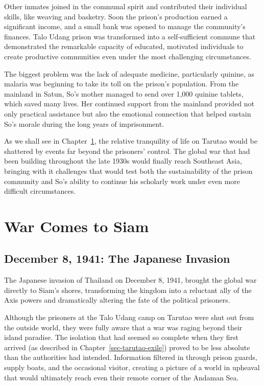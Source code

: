 \documentclass[
  Letterpaper,
]{scrbook}
\begin{document}
Other inmates joined in the communal spirit and contributed their
individual skills, like weaving and basketry. Soon the prison's
production earned a significant income, and a small bank was opened to
manage the community's finances. Talo Udang prison was transformed into
a self-sufficient commune that demonstrated the remarkable capacity of
educated, motivated individuals to create productive communities even
under the most challenging circumstances.

The biggest problem was the lack of adequate medicine, particularly
quinine, as malaria was beginning to take its toll on the prison's
population. From the mainland in Satun, So's mother managed to send over
1,000 quinine tablets, which saved many lives. Her continued support
from the mainland provided not only practical assistance but also the
emotional connection that helped sustain So's morale during the long
years of imprisonment.

As we shall see in Chapter~\ref{sec-war-comes-siam}, the relative
tranquility of life on Tarutao would be shattered by events far beyond
the prisoners' control. The global war that had been building throughout
the late 1930s would finally reach Southeast Asia, bringing with it
challenges that would test both the sustainability of the prison
community and So's ability to continue his scholarly work under even
more difficult circumstances.


\chapter{War Comes to Siam}\label{sec-war-comes-siam}

\section{December 8, 1941: The Japanese
Invasion}\label{december-8-1941-the-japanese-invasion}

The Japanese invasion of Thailand on December 8, 1941, brought the
global war directly to Siam's shores, transforming the kingdom into a
reluctant ally of the Axis powers and dramatically altering the fate of
the political prisoners.

Although the prisoners at the Talo Udang camp on Tarutao were shut out
from the outside world, they were fully aware that a war was raging
beyond their island paradise. The isolation that had seemed so complete
when they first arrived (as described in
Chapter~\ref{sec-tarutao-exile}) proved to be less absolute than the
authorities had intended. Information filtered in through prison guards,
supply boats, and the occasional visitor, creating a picture of a world
in upheaval that would ultimately reach even their remote corner of the
Andaman Sea.
\end{document}
